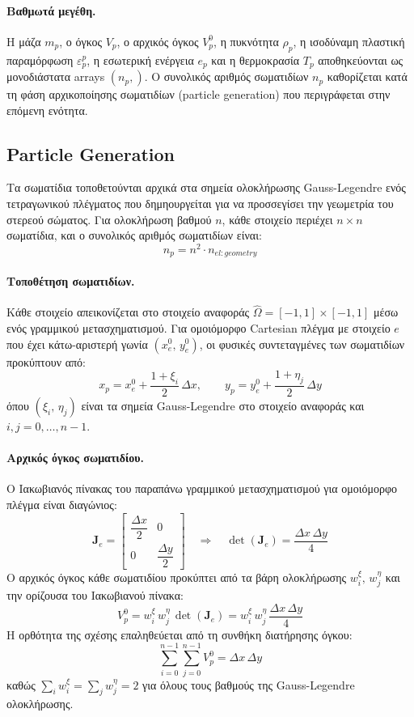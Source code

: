 \documentclass[12pt,a4paper]{report}
\begin{document}
	\paragraph{Βαθμωτά μεγέθη.} Η μάζα $m_p$, ο όγκος $V_p$, ο αρχικός όγκος $V_p^0$, η πυκνότητα $\rho_p$, η ισοδύναμη πλαστική παραμόρφωση $\varepsilon_p^p$, η εσωτερική ενέργεια $e_p$ και η θερμοκρασία $T_p$ αποθηκεύονται ως μονοδιάστατα arrays $(n_p,)$. Ο συνολικός αριθμός σωματιδίων $n_p$ καθορίζεται κατά τη φάση αρχικοποίησης σωματιδίων (particle generation) που περιγράφεται στην επόμενη ενότητα.

	\subsection{Particle Generation}

	Τα σωματίδια τοποθετούνται αρχικά στα σημεία ολοκλήρωσης Gauss-Legendre ενός τετραγωνικού πλέγματος που δημηουργείται για να προσσεγίσει την γεωμετρία του στερεού σώματος. Για ολοκλήρωση βαθμού $n$, κάθε στοιχείο περιέχει $n \times n$ σωματίδια, και ο συνολικός αριθμός σωματιδίων είναι:
	\[
		n_p = n^2 \cdot n_{el:geometry}
	\]

	\paragraph{Τοποθέτηση σωματιδίων.}
	Κάθε στοιχείο απεικονίζεται στο στοιχείο αναφοράς $\hat{\Omega} = [-1,1]\times[-1,1]$ μέσω ενός γραμμικού μετασχηματισμού. Για ομοιόμορφο Cartesian πλέγμα με στοιχείο $e$ που έχει κάτω-αριστερή γωνία $(x_e^0,\, y_e^0)$, οι φυσικές συντεταγμένες των σωματιδίων προκύπτουν από:
	\[
		x_p = x_e^0 + \frac{1+\xi_i}{2}\,\Delta x, \qquad
		y_p = y_e^0 + \frac{1+\eta_j}{2}\,\Delta y
	\]
	όπου $(\xi_i,\, \eta_j)$ είναι τα σημεία Gauss-Legendre στο στοιχείο αναφοράς και $i,j = 0,\ldots,n-1$.

	\paragraph{Αρχικός όγκος σωματιδίου.}
	Ο Ιακωβιανός πίνακας του παραπάνω γραμμικού μετασχηματισμού για ομοιόμορφο πλέγμα είναι διαγώνιος:
	\[
		\mathbf{J}_e =
		\begin{bmatrix} \dfrac{\Delta x}{2} & 0 \\[6pt] 0 & \dfrac{\Delta y}{2} \end{bmatrix}
		\quad\Longrightarrow\quad
		\det(\mathbf{J}_e) = \frac{\Delta x\,\Delta y}{4}
	\]
	Ο αρχικός όγκος κάθε σωματιδίου προκύπτει από τα βάρη ολοκλήρωσης $w_i^\xi,\, w_j^\eta$ και την ορίζουσα του Ιακωβιανού πίνακα:
	\[
		V_p^0 = w_i^\xi\, w_j^\eta\,\det(\mathbf{J}_e) = w_i^\xi\, w_j^\eta\,\frac{\Delta x\,\Delta y}{4}
	\]
	Η ορθότητα της σχέσης επαληθεύεται από τη συνθήκη διατήρησης όγκου:
	\[
		\sum_{i=0}^{n-1}\sum_{j=0}^{n-1} V_p^0 = \Delta x\,\Delta y
	\]
	καθώς $\sum_i w_i^\xi = \sum_j w_j^\eta = 2$ για όλους τους βαθμούς της Gauss-Legendre ολοκλήρωσης.
\end{document}
